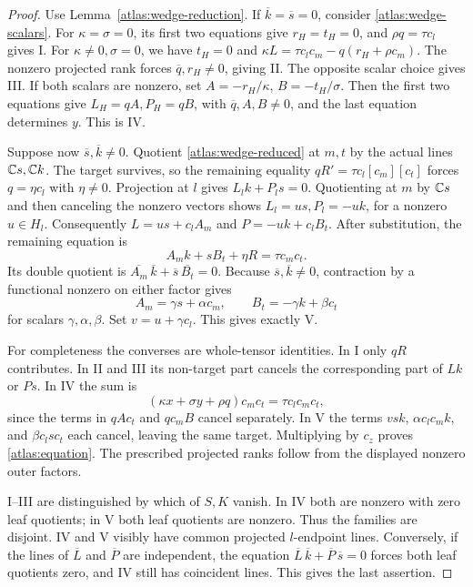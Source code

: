 \begin{proof}
Use Lemma~\ref{atlas:wedge-reduction}.  If \(\overline k=\overline s=0\),
consider \eqref{atlas:wedge-scalars}.
For \(\kappa=\sigma=0\), its first two equations give \(r_H=t_H=0\), and
\(\rho q=\tau c_l\) gives I.
For \(\kappa\ne0,\sigma=0\), we have \(t_H=0\) and
\(\kappa L=\tau c_lc_m-q(r_H+\rho c_m)\).  The nonzero projected rank
forces \(\overline q,r_H\ne0\), giving II.  The opposite scalar choice
gives III.  If both scalars are nonzero, set
\(A=-r_H/\kappa\), \(B=-t_H/\sigma\).  Then the first two equations give
\(L_H=qA,P_H=qB\), with \(\overline q,A,B\ne0\), and the last equation
determines \(y\).  This is IV.

Suppose now \(\overline s,\overline k\ne0\).  Quotient
\eqref{atlas:wedge-reduced} at \(m,t\) by the actual lines \(\mathbb C s,\mathbb C k\).
The target survives, so the remaining equality \(qR'=\tau c_l[c_m][c_t]\)
forces \(q=\eta c_l\) with \(\eta\ne0\).
Projection at \(l\) gives
\(L_lk+P_ls=0\).  Quotienting at \(m\) by \(\mathbb C s\) and then canceling
the nonzero vectors shows
\(L_l=us,P_l=-uk\), for a nonzero \(u\in H_l\).
Consequently \(L=us+c_lA_m\) and \(P=-uk+c_lB_t\).
After substitution, the remaining equation is
\[
 A_mk+sB_t+\eta R=\tau c_mc_t.
\]
Its double quotient is
\(\overline{A_m}\,\overline k+\overline s\,\overline{B_t}=0\).
Because \(\overline s,\overline k\ne0\), contraction by a functional
nonzero on either factor gives
\[
 A_m=\gamma s+\alpha c_m,\qquad
 B_t=-\gamma k+\beta c_t
\]
for scalars \(\gamma,\alpha,\beta\).  Set \(v=u+\gamma c_l\).
This gives exactly V.

For completeness the converses are whole-tensor identities.  In I only
\(qR\) contributes.  In II and III its non-target part cancels the corresponding
part of \(Lk\) or \(Ps\).  In IV the sum is
\[
 (\kappa x+\sigma y+\rho q)c_mc_t=\tau c_lc_mc_t,
\]
since the terms in \(qAc_t\) and \(qc_mB\) cancel separately.
In V the terms \(vsk\), \(\alpha c_lc_mk\), and \(\beta c_ls c_t\)
each cancel, leaving the same target.  Multiplying by \(c_z\) proves
\eqref{atlas:equation}.  The prescribed projected ranks follow from the
displayed nonzero outer factors.

I--III are distinguished by which of \(S,K\) vanish.  In IV both are
nonzero with zero leaf quotients; in V both leaf quotients are nonzero.
Thus the families are disjoint.  IV and V visibly have common projected
\(l\)-endpoint lines.  Conversely, if the lines of \(\overline L\) and
\(\overline P\) are independent, the equation
\(\overline L\,\overline k+\overline P\,\overline s=0\) forces both
leaf quotients zero, and IV still has coincident lines.  This gives the
last assertion.
\end{proof}

